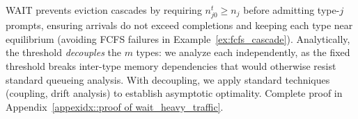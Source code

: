 

WAIT prevents eviction cascades by requiring $n_{j0}^t \geq n_j$ before admitting type-$j$ prompts, ensuring arrivals do not exceed completions and keeping each type near equilibrium (avoiding FCFS failures in Example~\ref{ex:fcfs_cascade}). Analytically, the threshold \emph{decouples} the $m$ types: we analyze each independently, as the fixed threshold breaks inter-type memory dependencies that would otherwise resist standard queueing analysis. With decoupling, we apply standard techniques (coupling, drift analysis) to establish asymptotic optimality. Complete proof in Appendix~\ref{appexidx::proof of wait_heavy_traffic}.

